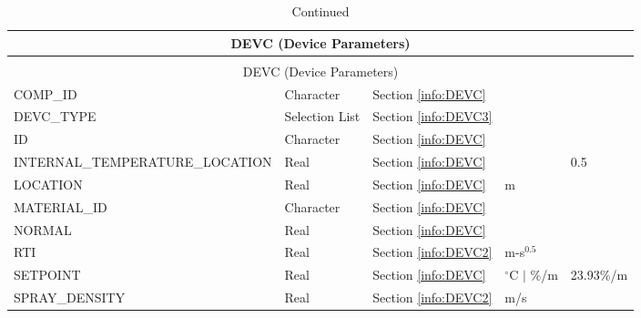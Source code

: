 \label{info:DEVC3}
\begin{longtable}{@{\extracolsep{\fill}}|l|l|l|l|l|}
\caption[Device Parameters ({\ct DEVC} namelist group)]{For more information see Section~\ref{info:DEVC}.}
\label{tbl:DEVC} \\
\hline
\multicolumn{5}{|c|}{{\ct DEVC} (Device Parameters)} \\
\hline \hline
\endfirsthead
\caption[]{Continued} \\
\hline
\multicolumn{5}{|c|}{{\ct DEVC} (Device Parameters)} \\
\hline \hline
\endhead
{\ct COMP\_ID}            & Character   & Section \ref{info:DEVC}     &                   &                 \\ \hline
{\ct DEVC\_TYPE}      & Selection List   & Section \ref{info:DEVC3}     &                   &                 \\ \hline
{\ct ID}      		      & Character   & Section \ref{info:DEVC}                 &                   &                 \\ \hline
{\ct INTERNAL\_TEMPERATURE\_LOCATION}     & Real        & Section \ref{info:DEVC}     &                   &       0.5       \\ \hline
{\ct LOCATION}       & Real        & Section \ref{info:DEVC}                 & m                 &                 \\ \hline
{\ct MATERIAL\_ID}            & Character   & Section \ref{info:DEVC}                 &                   &                 \\ \hline
{\ct NORMAL}         & Real        & Section \ref{info:DEVC}                 &                   &                 \\ \hline
{\ct RTI}                 & Real        & Section \ref{info:DEVC2}                 & m-s$^{0.5}$       &                 \\ \hline
{\ct SETPOINT}            & Real        & Section \ref{info:DEVC}     & $^\circ$C $\mid$ \%/m  &     23.93\%/m      \\ \hline
{\ct SPRAY\_DENSITY}      & Real        & Section \ref{info:DEVC2}     & m/s               &                 \\ \hline
\end{longtable}


